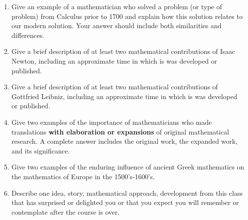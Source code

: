 \documentclass[12pt]{article}
\begin{document}
\begin{enumerate}
\item Give an example of a mathematician who solved a problem (or type of problem) from Calculus prior to 1700 and explain how this solution relates to our modern solution. Your answer should include both similarities and differences.
\item Give a brief description of at least two mathematical contributions of Isaac Newton, including an approximate time in which is was developed or published.
\item Give a brief description of at least two mathematical contributions of Gottfried Leibniz, including an approximate time in which is was developed or published.
\item Give two examples of the importance of mathematicians who made translations \textbf{with elaboration or expansions} of original mathematical research. A complete answer includes the original work, the expanded work, and its significance.
\item Give two examples of the enduring influence of ancient Greek mathematics on the mathematics of Europe in the 1500's-1600's.
\item Describe one idea, story, mathematical approach, development from this class that has surprised or delighted you or that you expect you will remember or contemplate after the course is over.
\end{enumerate}
\end{document}
